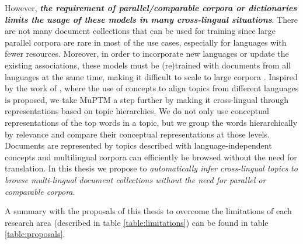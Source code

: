 However, \textbf{\textit{the requirement of parallel/comparable corpora or dictionaries limits the usage of these models in many cross-lingual situations}}. There are not many document collections that can be used for training since large parallel corpora are rare in most of the use cases, especially for languages with fewer resources. Moreover, in order to incorporate new languages or update the existing associations, these models must be (re)trained with documents from all languages at the same time, making it difficult to scale to large corpora \citep{Hao2018, Moritz2017}. Inspired by the work of \citep{Boyd-Graber2010}, where the use of concepts to align topics from different languages is proposed, we take MuPTM a step further by making it cross-lingual through representations based on topic hierarchies. We do not only use conceptual representations of the top words in a topic, but we group the words hierarchically by relevance and compare their conceptual representations at those levels. Documents are represented by topics described with language-independent concepts and multilingual corpora can efficiently be browsed without the need for translation. In this thesis we propose to \textit{automatically infer cross-lingual topics to browse multi-lingual document collections without the need for parallel or comparable corpora}.

A summary with the proposals of this thesis to overcome the limitations of each research area (described in table \ref{table:limitations}) can be found in table \ref{table:proposals}. 

